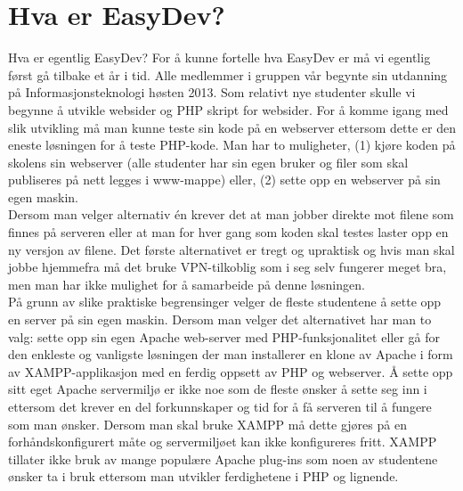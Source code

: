 \chapter{Hva er EasyDev?} \label{sec:hvaereasydev}

\lettrine[lines=2]{H}{}va er egentlig EasyDev? For å kunne fortelle hva EasyDev er må vi egentlig først gå tilbake et år i tid. Alle medlemmer i gruppen vår begynte sin utdanning på Informasjonsteknologi høsten 2013. Som relativt nye studenter skulle vi begynne å utvikle websider og PHP skript for websider. For å komme igang med slik utvikling må man kunne teste sin kode på en webserver ettersom dette er den eneste løsningen for å teste PHP-kode. Man har to muligheter, (1) kjøre koden på skolens sin webserver (alle studenter har sin egen bruker og filer som skal publiseres på nett legges i www-mappe) eller, (2) sette opp en webserver på sin egen maskin. \\
Dersom man velger alternativ én krever det at man jobber direkte mot filene som finnes på serveren eller at man for hver gang som koden skal testes laster opp en ny versjon av filene. Det første alternativet er tregt og upraktisk og hvis man skal jobbe hjemmefra må det bruke VPN-tilkoblig som i seg selv fungerer meget bra, men man har ikke mulighet for å samarbeide på denne løsningen.\\
På grunn av slike praktiske begrensinger velger de fleste studentene å sette opp en server på sin egen maskin. Dersom man velger  det alternativet har man to valg: sette opp sin egen Apache web-server med PHP-funksjonalitet eller gå for den enkleste og vanligste løsningen der man installerer en klone av Apache i form av XAMPP-applikasjon med en ferdig oppsett av PHP og webserver. Å sette opp sitt eget Apache servermiljø er ikke noe som de fleste ønsker å sette seg inn i ettersom det krever en del forkunnskaper og tid for å få serveren til å fungere som man ønsker. Dersom man skal bruke XAMPP må dette gjøres på en forhåndskonfigurert måte og servermiljøet kan ikke konfigureres fritt. XAMPP tillater ikke bruk av mange populære Apache plug-ins som noen av studentene ønsker ta i bruk ettersom man utvikler ferdighetene i PHP og lignende.

